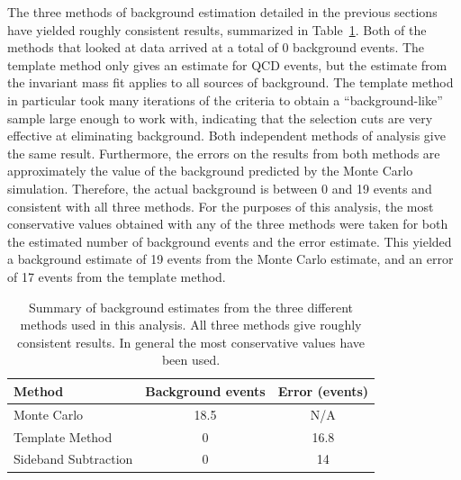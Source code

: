 The three methods of background estimation 
detailed in the previous sections have yielded 
roughly consistent results, 
summarized in Table~\ref{TableBGSub}.  
Both of the methods 
that looked at data arrived at a total 
of 0 background events.  
The template method only gives an estimate for 
QCD events, 
but the estimate from the invariant mass fit 
applies to all sources of background.  
The template method in particular 
took many iterations of the criteria 
to obtain a ``background-like'' sample 
large enough to work with, 
indicating 
that the selection 
cuts are very effective at eliminating background.  
Both independent 
methods of analysis give the same result.  
Furthermore, the errors on the results from 
both methods 
are approximately the value of the background 
predicted by the Monte Carlo simulation.  
Therefore, the actual background %
is between 0 and 19 events 
and consistent with 
all three methods.  
For the purposes of this analysis, 
the most conservative values obtained 
with any of the three methods were 
taken for both the estimated number 
of background events and the error estimate.  
This yielded a background estimate of 
19 events from the Monte Carlo estimate, 
and an error of 17 events from the template method.  

\begin{table}[htbp]
  \begin{center}
    \caption[\fixspacing Summary of background estimates from different methods]{
      \fixspacing Summary of background estimates from the three 
      different methods used in this analysis.  
      All three methods give roughly consistent results.  
      In general the most conservative values have been used.  
    }
    \label{TableBGSub}
    \begin{tabular}[]{ | l | c | c | }
      \hline
      Method & Background events & Error (events)  \\ \hline \hline
      Monte Carlo & 18.5 & N/A \\ \hline 
      Template Method & 0 & 16.8 \\ \hline 
      Sideband Subtraction & 0 & 14 \\ \hline 
    \end{tabular}
  \end{center}
\end{table}


